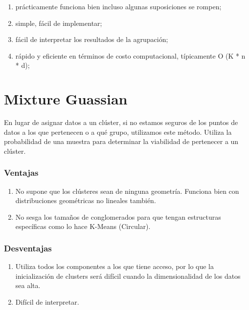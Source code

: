 \documentclass[11pt]{article}
\begin{document}
\begin{enumerate}
\def\labelenumi{\arabic{enumi})}
\item
  prácticamente funciona bien incluso algunas suposiciones se rompen;
\item
  simple, fácil de implementar;
\item
  fácil de interpretar los resultados de la agrupación;
\item
  rápido y eficiente en términos de costo computacional, típicamente O
  (K * n * d);
\end{enumerate}

    \section{Mixture Guassian}\label{mixture-guassian}

En lugar de asignar datos a un clúster, si no estamos seguros de los
puntos de datos a los que pertenecen o a qué grupo, utilizamos este
método. Utiliza la probabilidad de una muestra para determinar la
viabilidad de pertenecer a un clúster.

\subsubsection{Ventajas}\label{ventajas}

\begin{enumerate}
\def\labelenumi{\arabic{enumi}.}
\item
  No supone que los clústeres sean de ninguna geometría. Funciona bien
  con distribuciones geométricas no lineales también.
\item
  No sesga los tamaños de conglomerados para que tengan estructuras
  específicas como lo hace K-Means (Circular).
\end{enumerate}

\subsubsection{Desventajas}\label{desventajas}

\begin{enumerate}
\def\labelenumi{\arabic{enumi}.}
\item
  Utiliza todos los componentes a los que tiene acceso, por lo que la
  inicialización de clusters será difícil cuando la dimensionalidad de
  los datos sea alta.
\item
  Difícil de interpretar.
\end{enumerate}
\end{document}
